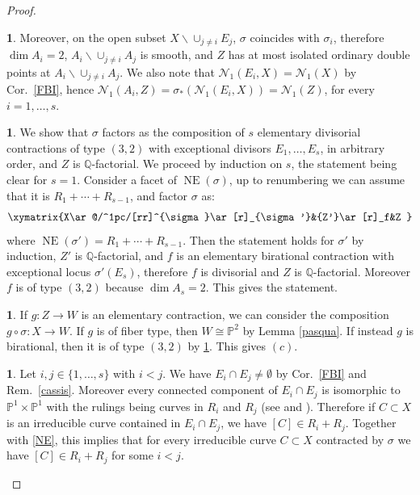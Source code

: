 \documentclass[a4paper,12pt]{amsart}
\theoremstyle{definition}
\newtheorem{prg}[thm]{}
\numberwithin{figure}{section}
\numberwithin{table}{section}
\newcommand{\pr}{\mathbb{P}}
\newcommand{\Q}{\mathbb{Q}}
\newcommand{\N}{\mathcal{N}_1}
\newcommand{\NE}{\operatorname{NE}}
\begin{document}
\begin{proof}
\begin{prg}
Moreover, on the open subset $X\smallsetminus\cup_{j\neq i}E_j$, $\sigma$ coincides with $\sigma_i$, therefore $\dim A_i=2$,  $A_i\smallsetminus   \cup_{j\neq i}A_j$ is smooth, and $Z$ has at most isolated ordinary double points at $A_i\smallsetminus   \cup_{j\neq i}A_j$. We also note that $\N(E_i,X)=\N(X)$ by Cor.~\ref{FBI}, hence $\N(A_i,Z)=\sigma_*(\N(E_i,X))=\N(Z)$, for every $i=1,\dotsc,s$.
\end{prg}
\begin{prg}\label{CUS}
  We show that $\sigma$ factors as the composition of $s$ elementary divisorial contractions of type $(3,2)$ with exceptional divisors $E_1,\dotsc,E_s$, in arbitrary order, and $Z$ is $\Q$-factorial. We proceed by induction on $s$, the statement being clear for $s=1$. Consider a facet of $\NE(\sigma)$, up to renumbering we can assume that it is $R_1+\cdots+R_{s-1}$, and factor $\sigma$ as:
  $$\xymatrix{X\ar@/^1pc/[rr]^{\sigma}\ar[r]_{\sigma'}&{Z'}\ar[r]_f&Z    }$$
  where $\NE(\sigma')=R_1+\cdots+R_{s-1}$. Then the statement holds for $\sigma'$ by induction, $Z'$ is $\Q$-factorial, and $f$ is an elementary birational contraction with exceptional locus $\sigma'(E_s)$, therefore $f$ is divisorial and $Z$ is $\Q$-factorial. Moreover $f$ is of type $(3,2)$ because $\dim A_s=2$. This gives the statement.
\end{prg}
\begin{prg}
 If $g\colon Z\to W$ is an elementary contraction, we can consider the composition $g\circ\sigma\colon X\to W$. If $g$ is of fiber type, then  $W\cong\pr^2$ by Lemma \ref{pasqua}. If instead $g$ is birational, then it is of type $(3,2)$ by \ref{CUS}. This gives $(c)$.
\end{prg}
\begin{prg}\label{caprera}
  Let $i,j\in\{1,\dotsc,s\}$ with $i<j$. We have $E_{i}\cap E_{j}\neq\emptyset$ by Cor.~\ref{FBI} and Rem.~\ref{cassis}. Moreover every connected component
  of  $E_{i}\cap E_{j}$ is isomorphic to $\pr^1\times\pr^1$ with the rulings being curves in $R_i$ and $R_j$  (see \cite[Lemma 4.15]{small} and \cite[Prop.~3.4]{32}). Therefore if $C\subset X$ is an irreducible curve contained in $E_i\cap E_j$, we have $[C]\in R_i+R_j$. Together with \ref{NE}, this implies that for every irreducible curve $C\subset X$ contracted by $\sigma$ we have  $[C]\in R_i+R_j$ for some $i<j$.
  

\end{prg}
\end{proof}
\end{document}
